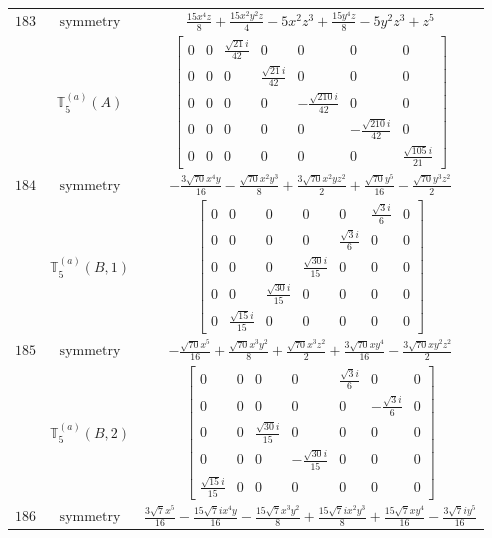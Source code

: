 \documentclass[fleqn,8pt,landscape]{jsarticle}
\begin{document}
\begin{longtable}{ccc}
$ 183 $ & $ \text{symmetry} $ & $ \frac{15 x^{4} z}{8} + \frac{15 x^{2} y^{2} z}{4} - 5 x^{2} z^{3} + \frac{15 y^{4} z}{8} - 5 y^{2} z^{3} + z^{5} $ \\
$  $ & $ \mathbb{T}_{5}^{(a)}(A) $ & $ \begin{bmatrix} 0 & 0 & \frac{\sqrt{21} i}{42} & 0 & 0 & 0 & 0 \\ 0 & 0 & 0 & \frac{\sqrt{21} i}{42} & 0 & 0 & 0 \\ 0 & 0 & 0 & 0 & - \frac{\sqrt{210} i}{42} & 0 & 0 \\ 0 & 0 & 0 & 0 & 0 & - \frac{\sqrt{210} i}{42} & 0 \\ 0 & 0 & 0 & 0 & 0 & 0 & \frac{\sqrt{105} i}{21} \end{bmatrix} $ \\ \hline
$ 184 $ & $ \text{symmetry} $ & $ - \frac{3 \sqrt{70} x^{4} y}{16} - \frac{\sqrt{70} x^{2} y^{3}}{8} + \frac{3 \sqrt{70} x^{2} y z^{2}}{2} + \frac{\sqrt{70} y^{5}}{16} - \frac{\sqrt{70} y^{3} z^{2}}{2} $ \\
$  $ & $ \mathbb{T}_{5}^{(a)}(B,1) $ & $ \begin{bmatrix} 0 & 0 & 0 & 0 & 0 & \frac{\sqrt{3} i}{6} & 0 \\ 0 & 0 & 0 & 0 & \frac{\sqrt{3} i}{6} & 0 & 0 \\ 0 & 0 & 0 & \frac{\sqrt{30} i}{15} & 0 & 0 & 0 \\ 0 & 0 & \frac{\sqrt{30} i}{15} & 0 & 0 & 0 & 0 \\ 0 & \frac{\sqrt{15} i}{15} & 0 & 0 & 0 & 0 & 0 \end{bmatrix} $ \\ \hline
$ 185 $ & $ \text{symmetry} $ & $ - \frac{\sqrt{70} x^{5}}{16} + \frac{\sqrt{70} x^{3} y^{2}}{8} + \frac{\sqrt{70} x^{3} z^{2}}{2} + \frac{3 \sqrt{70} x y^{4}}{16} - \frac{3 \sqrt{70} x y^{2} z^{2}}{2} $ \\
$  $ & $ \mathbb{T}_{5}^{(a)}(B,2) $ & $ \begin{bmatrix} 0 & 0 & 0 & 0 & \frac{\sqrt{3} i}{6} & 0 & 0 \\ 0 & 0 & 0 & 0 & 0 & - \frac{\sqrt{3} i}{6} & 0 \\ 0 & 0 & \frac{\sqrt{30} i}{15} & 0 & 0 & 0 & 0 \\ 0 & 0 & 0 & - \frac{\sqrt{30} i}{15} & 0 & 0 & 0 \\ \frac{\sqrt{15} i}{15} & 0 & 0 & 0 & 0 & 0 & 0 \end{bmatrix} $ \\ \hline
$ 186 $ & $ \text{symmetry} $ & $ \frac{3 \sqrt{7} x^{5}}{16} - \frac{15 \sqrt{7} i x^{4} y}{16} - \frac{15 \sqrt{7} x^{3} y^{2}}{8} + \frac{15 \sqrt{7} i x^{2} y^{3}}{8} + \frac{15 \sqrt{7} x y^{4}}{16} - \frac{3 \sqrt{7} i y^{5}}{16} $ \\

\end{longtable}
\end{document}
